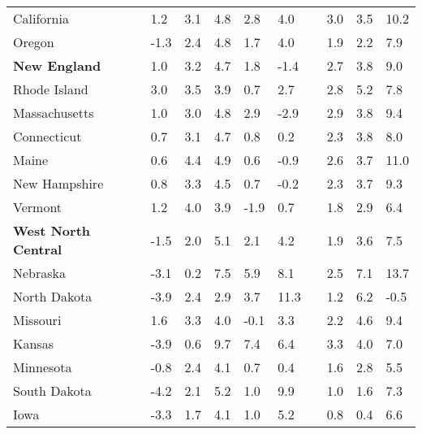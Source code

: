 {\begin{tabular}{p{29mm} R{8.5mm} R{8.5mm} R{8.5mm} R{8.5mm} 
             R{8.5mm} p{0mm} R{11mm} R{11mm} R{12mm} }
\hspace{3mm}  California  & 1.2 & 3.1 & 4.8 & 2.8 & 4.0 &  & 3.0 & 3.5 & 10.2 \\
\hspace{3mm}  Oregon  & -1.3 & 2.4 & 4.8 & 1.7 & 4.0 &  & 1.9 & 2.2 & 7.9 \\
\hspace{1mm} \textbf{New England}  & 1.0 & 3.2 & 4.7 & 1.8 & -1.4 &  & 2.7 & 3.8 & 9.0 \\
\hspace{3mm}  Rhode Island  & 3.0 & 3.5 & 3.9 & 0.7 & 2.7 &  & 2.8 & 5.2 & 7.8 \\
\hspace{3mm}  Massachusetts  & 1.0 & 3.0 & 4.8 & 2.9 & -2.9 &  & 2.9 & 3.8 & 9.4 \\
\hspace{3mm}  Connecticut  & 0.7 & 3.1 & 4.7 & 0.8 & 0.2 &  & 2.3 & 3.8 & 8.0 \\
\hspace{3mm}  Maine  & 0.6 & 4.4 & 4.9 & 0.6 & -0.9 &  & 2.6 & 3.7 & 11.0 \\
\hspace{3mm}  New Hampshire  & 0.8 & 3.3 & 4.5 & 0.7 & -0.2 &  & 2.3 & 3.7 & 9.3 \\
\hspace{3mm}  Vermont  & 1.2 & 4.0 & 3.9 & -1.9 & 0.7 &  & 1.8 & 2.9 & 6.4 \\
\hspace{1mm} \textbf{West North Central}  & -1.5 & 2.0 & 5.1 & 2.1 & 4.2 &  & 1.9 & 3.6 & 7.5 \\
\hspace{3mm}  Nebraska  & -3.1 & 0.2 & 7.5 & 5.9 & 8.1 &  & 2.5 & 7.1 & 13.7 \\
\hspace{3mm}  North Dakota  & -3.9 & 2.4 & 2.9 & 3.7 & 11.3 &  & 1.2 & 6.2 & -0.5 \\
\hspace{3mm}  Missouri  & 1.6 & 3.3 & 4.0 & -0.1 & 3.3 &  & 2.2 & 4.6 & 9.4 \\
\hspace{3mm}  Kansas  & -3.9 & 0.6 & 9.7 & 7.4 & 6.4 &  & 3.3 & 4.0 & 7.0 \\
\hspace{3mm}  Minnesota  & -0.8 & 2.4 & 4.1 & 0.7 & 0.4 &  & 1.6 & 2.8 & 5.5 \\
\hspace{3mm}  South Dakota  & -4.2 & 2.1 & 5.2 & 1.0 & 9.9 &  & 1.0 & 1.6 & 7.3 \\
\hspace{3mm}  Iowa  & -3.3 & 1.7 & 4.1 & 1.0 & 5.2 &  & 0.8 & 0.4 & 6.6 \\

\end{tabular}}
